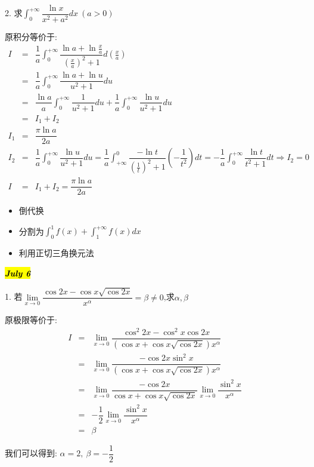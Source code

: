 2. 求$\int_{0}^{+\infty}\dfrac{\ln x}{x^2+a^2}dx\ (a>0)$
\begin{solution}
	
	原积分等价于: 
	\begin{eqnarray*}
		I&=&\dfrac{1}{a}\int_{0}^{+\infty}\dfrac{\ln a+\ln \frac{x}{a}}{(\frac{x}{a})^2+1}d(\frac{x}{a})\\
		&=&\dfrac{1}{a}\int_{0}^{+\infty}\dfrac{\ln a+\ln u}{u^2+1}du\\
		&=&\dfrac{\ln a}{a}\int_{0}^{+\infty}\dfrac{1}{u^2+1}du+\dfrac{1}{a}\int_{0}^{+\infty}\dfrac{\ln u}{u^2+1}du\\
		&=&I_{1}+I_{2}\\
		I_{1}&=&\dfrac{\pi \ln a}{2a}\\
		I_{2}&=&\dfrac{1}{a}\int_{0}^{+\infty}\dfrac{\ln u}{u^2+1}du=\dfrac{1}{a}\int_{+\infty}^{0}\dfrac{-\ln t }{(\frac{1}{t})^2+1}(-\dfrac{1}{t^2})dt=-\dfrac{1}{a}\int_{0}^{+\infty}\dfrac{\ln t}{t^2+1}dt\Rightarrow I_{2}=0\\
		I&=&I_{1}+I_{2}=\dfrac{\pi \ln a}{2a}
	\end{eqnarray*}
\end{solution}
\begin{anymark}
	\begin{itemize}
		\item 倒代换
		\item 分割为$\int_{0}^{1}f(x)+\int_{1}^{+\infty}f(x)dx$
		\item 利用正切三角换元法
	\end{itemize}
\end{anymark}

\hl{\textbf{\textit{July 6}}}

1. 若$\lim\limits_{x\rightarrow 0}\dfrac{\cos 2x-\cos x\sqrt{\cos 2x}}{x^{\alpha}}=\beta\neq0$,求$\alpha,\beta$
\begin{solution}
	
	原极限等价于: 
	\begin{eqnarray*}
		I&=&\lim\limits_{x\rightarrow 0}\dfrac{\cos^2 2x-\cos^2 x\cos 2x}{(\cos x+\cos x\sqrt{\cos 2x})x^{\alpha}}\\
		&=&\lim\limits_{x\rightarrow 0}\dfrac{-\cos2x\sin^2 x}{(\cos x+\cos x\sqrt{\cos 2x})x^{\alpha}}\\
		&=&\lim\limits_{x\rightarrow 0}\dfrac{-\cos 2x}{\cos x+\cos x\sqrt{\cos 2x}}\lim\limits_{x\rightarrow 0}\dfrac{\sin^2 x}{x^{\alpha}}\\
		&=&-\dfrac{1}{2}\lim\limits_{x\rightarrow 0}\dfrac{\sin^2 x}{x^{\alpha}}\\
		&=&\beta
	\end{eqnarray*}
	
	我们可以得到: $\alpha=2,\ \beta=-\dfrac{1}{2}$
\end{solution}

